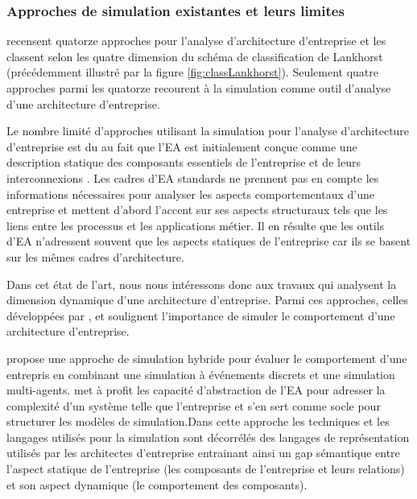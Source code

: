 	\subsubsection{Approches de simulation existantes et leurs limites}
\cite{manzur2015xarchimate} recensent quatorze approches pour l'analyse d'architecture d'entreprise et les classent selon les quatre dimension du schéma de classification de Lankhorst (précédemment illustré par la figure \ref{fig:classLankhorst}). Seulement quatre approches parmi les quatorze recourent à la simulation comme outil d'analyse d'une architecture d'entreprise.

Le nombre limité d'approches utilisant la simulation pour l'analyse d'architecture d'entreprise est du au fait que l'EA est initialement conçue comme une description statique des composants essentiels de l'entreprise et de leurs interconnexions \cite{hoffman2013enterprise}. Les cadres d'EA standards ne prennent pas en compte les informations nécessaires pour analyser les aspects comportementaux d'une entreprise et mettent d'abord l'accent sur ses aspects structuraux tels que les liens entre les processus et les applications métier. Il en résulte que les outils d'EA n'adressent souvent que les aspects statiques de l'entreprise car ils se basent sur les mêmes cadres d'architecture.


Dans cet état de l'art, nous nous intéressons donc aux travaux qui analysent la dimension dynamique d'une architecture d'entreprise. Parmi ces approches, celles développées par \cite{glazner2011enterprise}, \cite{ludwig2011organizational} et \cite{manzur2015xarchimate} soulignent l'importance de simuler le comportement d'une architecture d'entreprise. 

\cite{glazner2011enterprise} propose une approche de simulation hybride pour évaluer le comportement d'une entrepris en combinant une simulation à événements discrets et une simulation multi-agents. \cite{glazner2011enterprise} met à profit les capacité d'abstraction de l'EA pour adresser la complexité d'un système telle que l'entreprise et s'en sert comme socle pour structurer les modèles de simulation.Dans cette approche les techniques et les langages utilisés pour la simulation sont décorrélés des langages de représentation utilisés par les architectes d'entreprise entrainant ainsi un gap sémantique entre l'aspect statique de l'entreprise (les composants de l'entreprise et leurs relations) et son aspect dynamique (le comportement des composants).  

